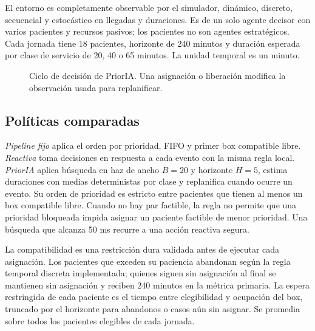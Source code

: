 \documentclass[conference]{IEEEtran}
\begin{document}
El entorno es completamente observable por el simulador, dinámico, discreto, secuencial y estocástico en llegadas y duraciones. Es de un solo agente decisor con varios pacientes y recursos pasivos; los pacientes no son agentes estratégicos. Cada jornada tiene 18 pacientes, horizonte de 240 minutos y duración esperada por clase de servicio de 20, 40 o 65 minutos. La unidad temporal es un minuto.

\begin{figure}[t]
\centering
\setlength{\fboxsep}{4pt}
\caption{Ciclo de decisión de PriorIA. Una asignación o liberación modifica la observación usada para replanificar.}
\label{fig:cycle}
\end{figure}

\subsection{Políticas comparadas}
\textit{Pipeline fijo} aplica el orden por prioridad, FIFO y primer box compatible libre. \textit{Reactiva} toma decisiones en respuesta a cada evento con la misma regla local. \textit{PriorIA} aplica búsqueda en haz de ancho $B=20$ y horizonte $H=5$, estima duraciones con medias deterministas por clase y replanifica cuando ocurre un evento. Su orden de prioridad es estricto entre pacientes que tienen al menos un box compatible libre. Cuando no hay par factible, la regla no permite que una prioridad bloqueada impida asignar un paciente factible de menor prioridad. Una búsqueda que alcanza 50 ms recurre a una acción reactiva segura.

La compatibilidad es una restricción dura validada antes de ejecutar cada asignación. Los pacientes que exceden su paciencia abandonan según la regla temporal discreta implementada; quienes siguen sin asignación al final se mantienen sin asignación y reciben 240 minutos en la métrica primaria. La espera restringida de cada paciente es el tiempo entre elegibilidad y ocupación del box, truncado por el horizonte para abandonos o casos aún sin asignar. Se promedia sobre todos los pacientes elegibles de cada jornada.
\end{document}
